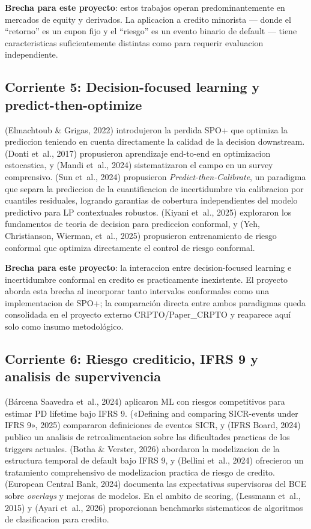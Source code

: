 \documentclass[
  spanish,
  11pt,
  letterpaper,
]{scrbook}
\theoremstyle{plain}
\theoremstyle{remark}
\begin{document}
\textbf{Brecha para este proyecto}: estos trabajos operan
predominantemente en mercados de equity y derivados. La aplicacion a
credito minorista --- donde el ``retorno'' es un cupon fijo y el
``riesgo'' es un evento binario de default --- tiene caracteristicas
suficientemente distintas como para requerir evaluacion independiente.

\subsection{Corriente 5: Decision-focused learning y
predict-then-optimize}\label{sec-sota-dfl}

(Elmachtoub \& Grigas, 2022) introdujeron la perdida SPO+ que optimiza
la prediccion teniendo en cuenta directamente la calidad de la decision
downstream. (Donti et~al., 2017) propusieron aprendizaje end-to-end en
optimizacion estocastica, y ({Mandi et~al.}, 2024) sistematizaron el
campo en un survey comprensivo. (Sun et~al., 2024) propusieron
\emph{Predict-then-Calibrate}, un paradigma que separa la prediccion de
la cuantificacion de incertidumbre via calibracion por cuantiles
residuales, logrando garantias de cobertura independientes del modelo
predictivo para LP contextuales robustos. ({Kiyani et~al.}, 2025)
exploraron los fundamentos de teoria de decision para prediccion
conformal, y (Yeh, Christianson, Wierman, et~al., 2025) propusieron
entrenamiento de riesgo conformal que optimiza directamente el control
de riesgo conformal.

\textbf{Brecha para este proyecto}: la interaccion entre
decision-focused learning e incertidumbre conformal en credito es
practicamente inexistente. El proyecto aborda esta brecha al incorporar
tanto intervalos conformales como una implementacion de SPO+; la
comparación directa entre ambos paradigmas queda consolidada en el
proyecto externo CRPTO/Paper\_CRPTO y reaparece aquí solo como insumo
metodológico.

\subsection{Corriente 6: Riesgo crediticio, IFRS 9 y analisis de
supervivencia}\label{sec-sota-credit}

({Bárcena Saavedra et~al.}, 2024) aplicaron ML con riesgos competitivos
para estimar PD lifetime bajo IFRS 9. ({«Defining and comparing
{SICR}-events under {IFRS} 9»}, 2025) compararon definiciones de eventos
SICR, y (IFRS Board, 2024) publico un analisis de retroalimentacion
sobre las dificultades practicas de los triggers actuales. (Botha \&
Verster, 2026) abordaron la modelizacion de la estructura temporal de
default bajo IFRS 9, y ({Bellini et~al.}, 2024) ofrecieron un
tratamiento comprehensivo de modelizacion practica de riesgo de credito.
(European Central Bank, 2024) documenta las expectativas supervisoras
del BCE sobre \emph{overlays} y mejoras de modelos. En el ambito de
scoring, ({Lessmann et~al.}, 2015) y (Ayari et~al., 2026) proporcionan
benchmarks sistematicos de algoritmos de clasificacion para credito.
\end{document}
